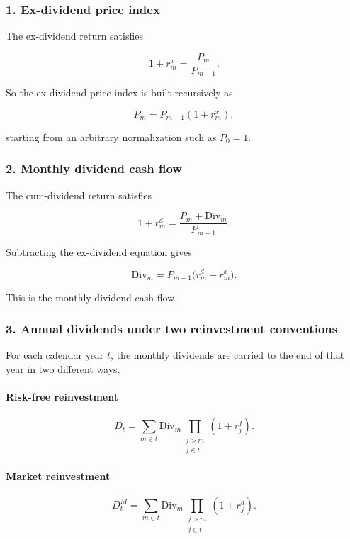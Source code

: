 \documentclass[11pt]{article}
\begin{document}
\subsubsection{1. Ex-dividend price
index}\label{ex-dividend-price-index}

The ex-dividend return satisfies

\[
1+r_m^x = \frac{P_m}{P_{m-1}}.
\]

So the ex-dividend price index is built recursively as

\[
P_m = P_{m-1}(1+r_m^x),
\]

starting from an arbitrary normalization such as \(P_0=1\).

\subsubsection{2. Monthly dividend cash
flow}\label{monthly-dividend-cash-flow}

The cum-dividend return satisfies

\[
1+r_m^d = \frac{P_m+\mathrm{Div}_m}{P_{m-1}}.
\]

Subtracting the ex-dividend equation gives

\[
\mathrm{Div}_m = P_{m-1}\bigl(r_m^d-r_m^x\bigr).
\]

This is the monthly dividend cash flow.

\subsubsection{3. Annual dividends under two reinvestment
conventions}\label{annual-dividends-under-two-reinvestment-conventions}

For each calendar year \(t\), the monthly dividends are carried to the
end of that year in two different ways.

\paragraph{Risk-free reinvestment}\label{risk-free-reinvestment}

\[
D_t
=
\sum_{m \in t}
\mathrm{Div}_m
\prod_{\substack{j>m \\ j \in t}}
(1+r_j^f).
\]

\paragraph{Market reinvestment}\label{market-reinvestment}

\[
D_t^M
=
\sum_{m \in t}
\mathrm{Div}_m
\prod_{\substack{j>m \\ j \in t}}
(1+r_j^d).
\]
\end{document}
